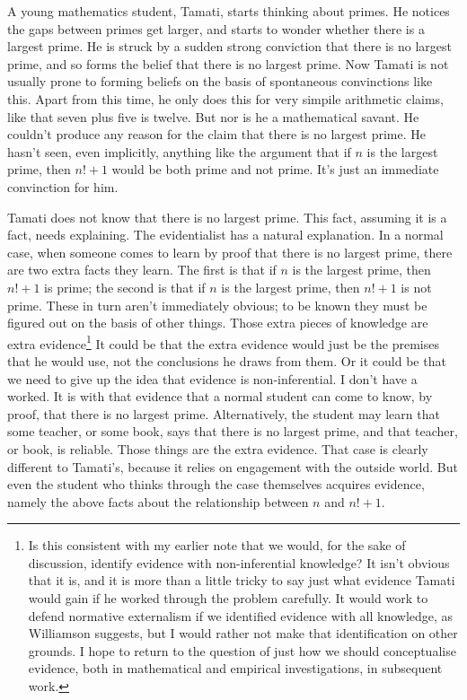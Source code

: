 \documentclass[
  10pt,
  letterpaper,
  twoside]{scrbook}
\begin{document}
A young mathematics student, {Tamati}, starts thinking about primes. He
notices the gaps between primes get larger, and starts to wonder whether
there is a largest prime. He is struck by a sudden strong conviction
that there is no largest prime, and so forms the belief that there is no
largest prime. Now {Tamati} is not usually prone to forming beliefs on
the basis of spontaneous convinctions like this. Apart from this time,
he only does this for very simpile arithmetic claims, like that seven
plus five is twelve. But nor is he a mathematical savant. He couldn't
produce any reason for the claim that there is no largest prime. He
hasn't seen, even implicitly, anything like the argument that if \(n\)
is the largest prime, then \(n! + 1\) would be both prime and not prime.
It's just an immediate convinction for him.

{Tamati} does not know that there is no largest prime. This fact,
assuming it is a fact, needs explaining. The evidentialist has a natural
explanation. In a normal case, when someone comes to learn by proof that
there is no largest prime, there are two extra facts they learn. The
first is that if \(n\) is the largest prime, then \(n! + 1\) is prime;
the second is that if \(n\) is the largest prime, then \(n! + 1\) is not
prime. These in turn aren't immediately obvious; to be known they must
be figured out on the basis of other things. Those extra pieces of
knowledge are extra evidence\footnote{Is this consistent with my earlier
  note that we would, for the sake of discussion, identify evidence with
  non-inferential knowledge? It isn't obvious that it is, and it is more
  than a little tricky to say just what evidence {Tamati} would gain if
  he worked through the problem carefully. It would work to defend
  normative externalism if we identified evidence with all knowledge, as
  Williamson suggests, but I would rather not make that identification
  on other grounds. I hope to return to the question of just how we
  should conceptualise evidence, both in mathematical and empirical
  investigations, in subsequent work.} It could be that the extra
evidence would just be the premises that he would use, not the
conclusions he draws from them. Or it could be that we need to give up
the idea that evidence is non-inferential. I don't have a worked. It is
with that evidence that a normal student can come to know, by proof,
that there is no largest prime. Alternatively, the student may learn
that some teacher, or some book, says that there is no largest prime,
and that teacher, or book, is reliable. Those things are the extra
evidence. That case is clearly different to {Tamati}'s, because it
relies on engagement with the outside world. But even the student who
thinks through the case themselves acquires evidence, namely the above
facts about the relationship between \(n\) and \(n! + 1\).
\end{document}
